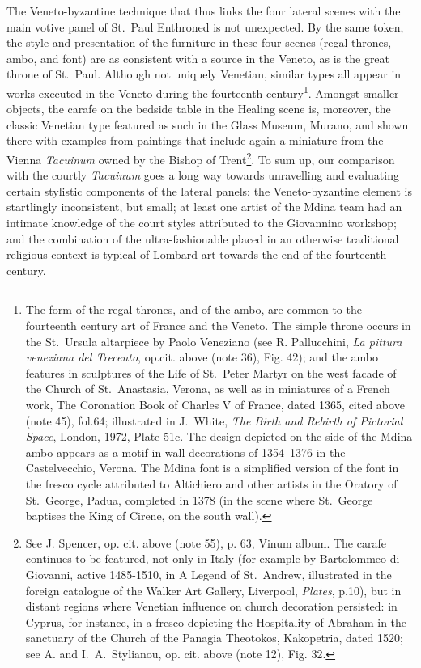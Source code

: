 \documentclass[a4paper,12pt]{article}
\begin{document}
The Veneto-byzantine technique that thus links the four lateral scenes
with the main votive panel of St.~Paul Enthroned is not unexpected. By
the same token, the style and presentation of the furniture in these
four scenes (regal thrones, ambo, and font) are as consistent with a
source in the Veneto, as is the great throne of St.~Paul. Although not
uniquely Venetian, similar types all appear in works executed in the
Veneto during the fourteenth century\footnote{The form of the regal
thrones, and of the ambo, are common to the fourteenth century art of
France and the Veneto. The simple throne occurs in the St.~Ursula
altarpiece by Paolo Veneziano (see R. Pallucchini, \textit{La pittura
veneziana del Trecento}, op.cit. above (note 36), Fig. 42); and the
ambo features in sculptures of the Life of St.~Peter Martyr on the west
facade of the Church of St.~Anastasia, Verona, as well as in
miniatures of a French work, The Coronation Book of Charles V of
France, dated 1365, cited above (note 45), fol.64; illustrated in
J.~White, \textit{The Birth and Rebirth of Pictorial Space}, London,
1972, Plate 51c. The design depicted on the side of the Mdina ambo
appears as a motif in wall decorations of 1354--1376 in the
Castelvecchio, Verona. The Mdina font is a simplified version of the
font in the fresco cycle attributed to Altichiero and other artists in
the Oratory of St.~George, Padua, completed in 1378 (in the scene
where St.~George baptises the King of Cirene, on the south
wall).}. Amongst smaller objects, the carafe on the bedside table in
the Healing scene is, moreover, the classic Venetian type featured as
such in the Glass Museum, Murano, and shown there with examples from
paintings that include again a miniature from the Vienna
\textit{Tacuinum }owned by the Bishop of Trent\footnote{See
J. Spencer, op. cit. above (note 55), p. 63, Vinum album. The carafe
continues to be featured, not only in Italy (for example by
Bartolommeo di Giovanni, active 1485-1510, in A Legend of St.~Andrew,
illustrated in the foreign catalogue of the Walker Art Gallery,
Liverpool, \textit{Plates}, p.10), but in distant regions where
Venetian influence on church decoration persisted: in Cyprus, for
instance, in a fresco depicting the Hospitality of Abraham in the
sanctuary of the Church of the Panagia Theotokos, Kakopetria, dated
1520; see A. and I.~A.~Stylianou, op. cit. above (note 12),
Fig. 32.}. To sum up, our comparison with the courtly \textit{Tacuinum
} goes a long way towards unravelling and evaluating certain stylistic
components of the lateral panels: the Veneto-byzantine element is
startlingly inconsistent, but small; at least one artist of the Mdina
team had an intimate knowledge of the court styles attributed to the
Giovannino workshop; and the combination of the ultra-fashionable
placed in an otherwise traditional religious context is typical of
Lombard art towards the end of the fourteenth century.
\end{document}
